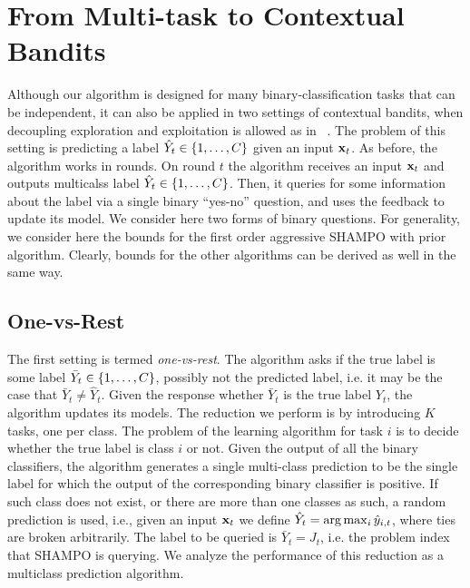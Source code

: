 \chapter{From Multi-task to Contextual Bandits}\label{chap:multiclass}
Although our algorithm is designed for many binary-classification tasks that can be independent, 
it can also be applied in two settings of contextual bandits, when decoupling exploration and 
exploitation is allowed as in ~\cite{DBLP:conf/icml/YuM09,DBLP:conf/icml/AvnerMS12}. 
The problem of this setting is predicting a label $\hat{Y}_t \in\{ 1 , \ldots , C\}$ given an input $\mathbf{x}_{t}$. 
As before, the algorithm works in rounds. On round $t$ the algorithm receives an input $\mathbf{x}_{t}$ and 
outputs  multicalss label $\hat{Y}_t\in\{1 , \ldots , C\}$. 
Then, it queries for some information about the label via a single binary ``yes-no'' question, and uses the 
feedback to update its model. We consider here two forms of binary questions. For generality, we consider 
here the bounds for  the first order aggressive SHAMPO with prior algorithm. 
Clearly, bounds for the other algorithms can be derived as well in the same way.

\section{One-vs-Rest}
The first setting is termed {\em one-vs-rest}. The algorithm asks if the true label is some label 
$\bar{Y}_t\in\{ 1 , \ldots , C\}$, possibly not the predicted label, i.e. it may be the case that 
$\bar{Y}_t \neq\hat{Y}_t$. Given the response whether  $\bar{Y}_t$ is the true label $Y_t$, the algorithm 
updates its models. The reduction we perform is by introducing $K$ tasks, one per class. 
The problem of the learning algorithm for task $i$ is to decide whether the true label is class $i$ or not. 
Given the output of all the binary classifiers, the algorithm generates a single multi-class prediction to be the 
single label for which the output of the corresponding binary classifier is positive. If such class does not 
exist, or there are more than one classes  as such, a random prediction is used, i.e., given an input $\mathbf{x}_{t}$ 
we define $\hat{Y}_t = \arg\max_i \hat{y}_{i,t}$, where ties are broken arbitrarily. The label to be queried is 
$\bar{Y}_t=J_t$, i.e. the problem index that SHAMPO is querying. We analyze the performance of this 
reduction as a multiclass prediction algorithm.


